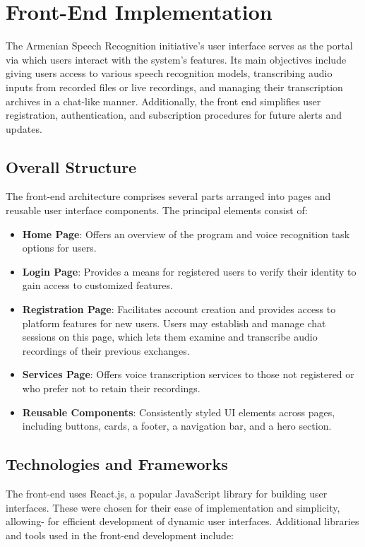 \documentclass[conference]{IEEEtran}
\begin{document}
\section{Front-End Implementation}

The Armenian Speech Recognition initiative's user interface serves as the portal via which users interact with the system's features. Its main objectives include giving users access to various speech recognition models, transcribing audio inputs from recorded files or live recordings, and managing their transcription archives in a chat-like manner. Additionally, the front end simplifies user registration, authentication, and subscription procedures for future alerts and updates.

\subsection{Overall Structure}

The front-end architecture comprises several parts arranged into pages and reusable user interface components. The principal elements consist of:

\begin{itemize}
\item \textbf{Home Page}: Offers an overview of the program and voice recognition task options for users.
    \item \textbf{Login Page}: Provides a means for registered users to verify their identity to gain access to customized features.
    \item \textbf{Registration Page}: Facilitates account creation and provides access to platform features for new users.
    Users may establish and manage chat sessions on this page, which lets them examine and transcribe audio recordings of their previous exchanges.
    \item \textbf{Services Page}: Offers voice transcription services to those not registered or who prefer not to retain their recordings.
    \item \textbf{Reusable Components}: Consistently styled UI elements across pages, including buttons, cards, a footer, a navigation bar, and a hero section.
\end{itemize}

\subsection{Technologies and Frameworks}

The front-end uses React.js, a popular JavaScript library for building user interfaces. These were chosen for their ease of implementation and simplicity, allowing-
for efficient development of dynamic user interfaces. Additional libraries and tools used in the front-end development include:
\end{document}
